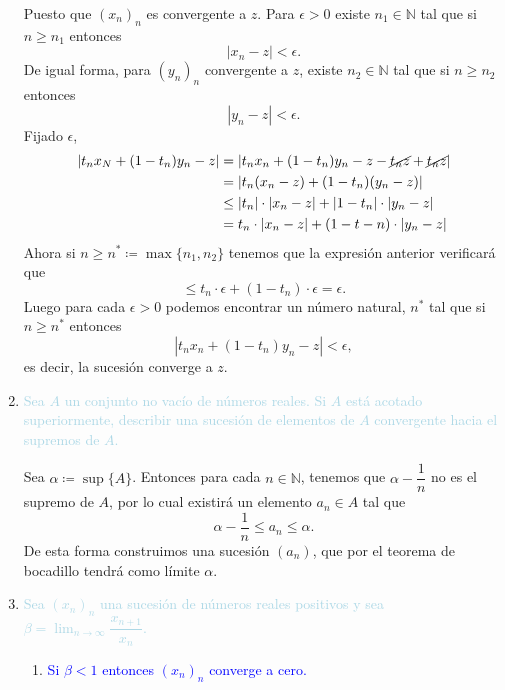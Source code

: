 \begin{enumerate}[label=\color{red}\textbf{\arabic*)}, leftmargin=*]
	Puesto que $(x_n)_n$ es convergente a $z$. Para $\epsilon>0$ existe $n_1\in\mathbb{N}$ tal que si $n\ge n_1$ entonces \[ |x_n-z|<\epsilon. \]
	De igual forma, para $(y_n)_n$ convergente a $z$, existe $n_2\in\mathbb{N}$ tal que si $n\ge n_2$ entonces \[ |y_n-z|<\epsilon. \]
	Fijado $\epsilon$, \[ \begin{aligned}
		|t_nx_N+(1-t_n)y_n-z|&=|t_nx_n+(1-t_n)y_n-z-\cancel{t_nz}+\cancel{t_nz}|\\
		&=|t_n(x_n-z)+(1-t_n)(y_n-z)|\\
		&\le|t_n|\cdot|x_n-z|+|1-t_n|\cdot|y_n-z|\\
		&=t_n\cdot|x_n-z|+(1-t-n)\cdot|y_n-z|
	\end{aligned} \]
	Ahora si $n\ge n^*\coloneq\max\{n_1,n_2\}$ tenemos que la expresión anterior verificará que \[ \le t_n\cdot\epsilon+(1-t_n)\cdot\epsilon=\epsilon. \]
	Luego para cada $\epsilon>0$ podemos encontrar un número natural, $n^*$ tal que si $n\ge n^*$ entonces \[ |t_nx_n+(1-t_n)y_n-z|<\epsilon, \] es decir, la sucesión converge a $z$.
	\item \textcolor{lightblue}{Sea $A$ un conjunto no vacío de números reales. Si $A$ está acotado superiormente, describir una sucesión de elementos de $A$ convergente hacia el supremos de $A$.}
	
	Sea $\alpha\coloneq\sup\{A\}$. Entonces para cada $n\in\mathbb{N}$, tenemos que $\alpha-\dfrac{1}{n}$ no es el supremo de $A$, por lo cual existirá un elemento $a_n\in A$ tal que \[ \alpha-\dfrac{1}{n}\le a_n\le \alpha. \] De esta forma construimos una sucesión $(a_n)$, que por el teorema de bocadillo tendrá como límite $\alpha$.
	\item \textcolor{lightblue}{Sea $(x_n)_n$ una sucesión de números reales positivos y sea $\beta=\lim_{n\to\infty}\dfrac{x_{n+1}}{x_n}$.}
	\begin{enumerate}[label=\color{red}\arabic*)]
		\item \textcolor{blue}{Si $\beta<1$ entonces $(x_n)_n$ converge a cero.}
		

\end{enumerate}
\end{enumerate}
